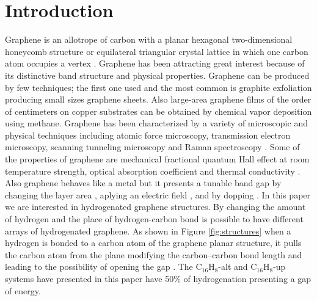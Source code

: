 \documentclass[aps,pra,11pt,tightenlines,showpacs,superscriptaddress,groupedaddress]{revtex4-1}
\newcommand{\altstc}{C$_{16}$H$_{8}$-alt}
\newcommand{\upstc}{C$_{16}$H$_{8}$-up}
\begin{document}
\maketitle



\section{Introduction}\label{sec:intro}


Graphene is an allotrope of carbon with a planar hexagonal two-dimensional
honeycomb structure or equilateral triangular crystal lattice in which one
carbon atom occupies a vertex \cite{geim2007rise}. 
Graphene has been attracting great interest because of its distinctive band structure and physical properties. Graphene can be produced by few techniques; the first one used and the most common is graphite exfoliation producing small sizes graphene sheets. Also large-area graphene films of the order of centimeters on copper substrates can be obtained by chemical vapor deposition using methane.
Graphene has been characterized by a variety of microscopic and physical techniques including atomic force microscopy, transmission electron microscopy, scanning tunneling microscopy and Raman spectroscopy \cite{geim2007rise,rao2009graphene,boehm1994nomenclature,novoselov2005two}. 
Some of the properties of graphene are mechanical fractional quantum Hall effect at room temperature
strength, optical absorption coefficient and thermal conductivity
\cite{geim2007rise, nair2008fine}. Also graphene behaves like a metal
\cite{geim2007rise} but it presents a tunable band gap by changing the layer
area \cite{han2007energy}, aplying an electric field \cite{zhang2009direct},
and by dopping \cite{ohta2006controlling,
elias2009control,guisinger2009exposure,samarakoon2010tunable}. In this paper we are interested in hydrogenated graphene structures. By changing the amount of hydrogen and the place of hydrogen-carbon bond is possible to have different arrays of hydrogenated graphene.
 As shown in
Figure \ref{fig:structures} when a hydrogen is bonded to a carbon atom of the
graphene planar structure, it pulls the carbon atom from the plane modifying the 
carbon--carbon bond length and leading to the possibility of opening the gap
\cite{samarakoon2010tunable}. The {\altstc} and {\upstc} systems have presented in 
this paper have 50\% of hydrogenation presenting a gap of energy.
\end{document}
